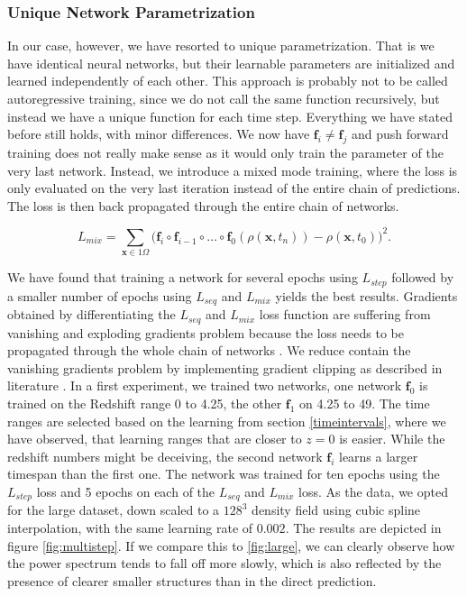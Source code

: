 \documentclass{article}
\begin{document}
\subsubsection{Unique Network Parametrization}
In our case, however, we have resorted to unique parametrization. That is we have identical neural networks, but their learnable parameters are initialized and learned independently of each other. This approach is probably not to be called autoregressive training, since we do not call the same function recursively, but instead we have a unique function for each time step. Everything we have stated before still holds, with minor differences. We now have $\mathbf{f}_i \neq \mathbf{f}_j$ and push forward training does not really make sense as it would only train the parameter of the very last network. Instead, we introduce a mixed mode training, where the loss is only evaluated on the very last iteration instead of the entire chain of predictions. The loss is then back propagated through the entire chain of networks.

\begin{equation}
\label{mix}
    L_{mix} = \sum_{\mathbf{x} \in 1 \Omega} \Biggl(\mathbf{f}_i \circ \mathbf{f}_{i-1} \circ \dots \circ \mathbf{f}_0 (\rho(\mathbf{x}, t_{n})) - \rho(\mathbf{x}, t_{0})\Biggr)^2.
\end{equation}

We have found that training a network for several epochs using $L_{step}$ followed by a smaller number of epochs using $L_{seq}$ and $L_{mix}$ yields the best results. Gradients obtained by differentiating the $L_{seq}$ and $L_{mix}$ loss function are suffering from vanishing and exploding gradients problem because the loss needs to be propagated through the whole chain of networks \citep{thuerey2021physics}. We reduce contain the vanishing gradients problem by implementing gradient clipping as described in literature \citep{zhang2019gradient}. In a first experiment, we trained two networks, one network $\mathbf{f}_0$ is trained on the Redshift range 0 to 4.25, the other  $\mathbf{f}_1$ on 4.25 to 49. The time ranges are selected based on the learning from section \ref{timeintervals}, where we have observed, that learning ranges that are closer to $z=0$ is easier. While the redshift numbers might be deceiving, the second network  $\mathbf{f}_i$ learns a larger timespan than the first one. The network was trained for ten epochs using the $L_{step}$ loss and 5 epochs on each of the $L_{seq}$ and $L_{mix}$ loss. As the data, we opted for the large dataset, down scaled to a $128^3$ density field using cubic spline interpolation, with the same learning rate of $0.002$. The results are depicted in figure \ref{fig:multistep}. If we compare this to \ref{fig:large}, we can clearly observe how the power spectrum tends to fall off more slowly, which is also reflected by the presence of clearer smaller structures than in the direct prediction. 
\end{document}
